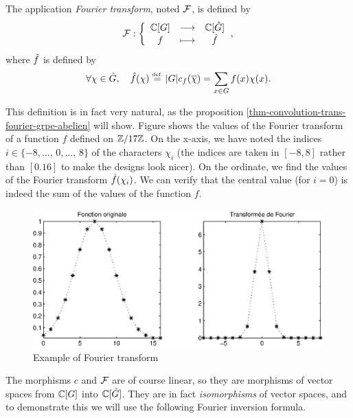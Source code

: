 \begin{defn}
\label{notation-22} The application \textit{Fourier transform}, noted $\mathcal{F} $, is defined by
\begin{equation}
\label{eq-transf-fourier-grpe-abelien}
\mathcal{F}: {\left\{ \begin{array}{ccc} \mathbb{C}[G] & \longrightarrow & \mathbb{C}[\hat{G}] \\ f & \longmapsto & \hat{f} \end{array} \right.},
\end{equation}
where $\hat{f}$ is defined by
\begin{equation*}
\forall \chi \in \hat{G}, \quad \hat{f}(\chi) \stackrel{\mbox{\upshape\tiny def.}}{=} |G| c_f(\overline{\chi}) = \sum_{x \in G}{f (x) \chi(x)}.
\end{equation*}

\end{defn}
This definition is in fact very natural, as the proposition \ref{thm-convolution-trans-fourier-grpe-abelien} will show. Figure  shows the values of the Fourier transform of a  function $f$ defined on $\mathbb{Z}/17 \mathbb{Z}$. On the x-axis, we have noted the indices $ i \in \{- 8, \ldots, \, 0, \ldots, \, 8\}$ of the characters $\chi_i $ (the indices are taken in $[- 8, 8]$ rather than $[0.16]$ to make the designs look nicer). On the ordinate, we find the values of the Fourier transform $\hat{f}(\chi_i)$. We can verify that the central value (for $ i = 0 $) is indeed the sum of the values of the function $f$. \begin{figure}[ht]
    \begin{center}
    \includegraphics[scale = 0.7]{images/decomposition-fourier.eps}
    \end{center}
    \caption{Example of Fourier transform}
\label{fig-decomposition-fourier}
\end{figure}


\begin{rem}
The morphisms $ c $ and $\mathcal{F} $ are of course linear, so they are morphisms of vector spaces from $\mathbb{C}[G]$ into $\mathbb{C}[\hat{G}]$. They are in fact \textit{isomorphisms} of vector spaces, and to demonstrate this we will use the following Fourier inversion formula.
\end{rem}


